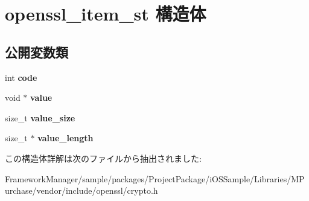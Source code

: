 \hypertarget{structopenssl__item__st}{}\section{openssl\+\_\+item\+\_\+st 構造体}
\label{structopenssl__item__st}
\subsection*{公開変数類}
\begin{DoxyCompactItemize}
\item 
\hypertarget{structopenssl__item__st_a5e174401dbd1505959e9fab66d07530e}{}int {\bfseries code}\label{structopenssl__item__st_a5e174401dbd1505959e9fab66d07530e}

\item 
\hypertarget{structopenssl__item__st_a98e9b9c11f757937cee8119f22c3e116}{}void $\ast$ {\bfseries value}\label{structopenssl__item__st_a98e9b9c11f757937cee8119f22c3e116}

\item 
\hypertarget{structopenssl__item__st_ab073a992ed1a5ba36d5e8627ca42e93d}{}size\+\_\+t {\bfseries value\+\_\+size}\label{structopenssl__item__st_ab073a992ed1a5ba36d5e8627ca42e93d}

\item 
\hypertarget{structopenssl__item__st_a1df8749d942642c9a3d867bd574d647a}{}size\+\_\+t $\ast$ {\bfseries value\+\_\+length}\label{structopenssl__item__st_a1df8749d942642c9a3d867bd574d647a}

\end{DoxyCompactItemize}


この構造体詳解は次のファイルから抽出されました\+:\begin{DoxyCompactItemize}
\item 
Framework\+Manager/sample/packages/\+Project\+Package/i\+O\+S\+Sample/\+Libraries/\+M\+Purchase/vendor/include/openssl/crypto.\+h\end{DoxyCompactItemize}
